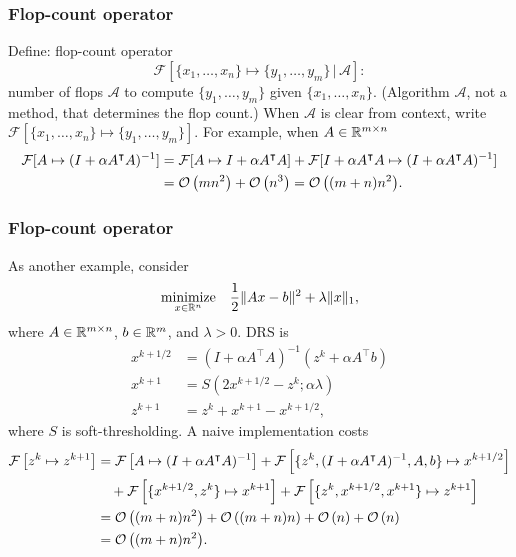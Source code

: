 \documentclass[10pt,mathserif]{beamer}
\begin{document}
\begin{frame}[fragile]
\frametitle{Flop-count operator}
Define: flop-count operator
\[
\mathcal{F}\left[\{x_1,\dots,x_n\}\mapsto\{y_1,\dots,y_m\}\,|\,\mathcal{A}\right]:
\]
number of flops $\mathcal{A}$ to compute $\{y_1,\dots,y_m\}$ given $\{x_1,\dots,x_n\}$.
(Algorithm $\mathcal{A}$, not a method, that determines the flop count.)
\medskip
When $\mathcal{A}$ is clear from context, %
write
$
\mathcal{F}\left[\{x_1,\dots,x_n\}\mapsto\{y_1,\dots,y_m\}\right].
$
%
\medskip \pause
For example, when $A\in \mathbb{R}^{m\times n}$
\begingroup\makeatletter\def\f@size{9}\check@mathfonts
\begin{align*}
\mathcal{F}[A\mapsto(I+\alpha A^\intercal A)^{-1}]
&=
\mathcal{F}[A\mapsto I+\alpha A^\intercal A]+\mathcal{F}[ I+\alpha A^\intercal A\mapsto (I+\alpha A^\intercal A)^{-1}]\\
&={\mathcal{O}\left(mn^2\right)}+{\mathcal{O}\left(n^3\right)}
={\mathcal{O}\left((m+n)n^2\right)}.
\end{align*}
\endgroup
\end{frame}


\begin{frame}
\frametitle{Flop-count operator}
As another example, consider
\[
\begin{array}{ll}
\underset{x\in \mathbb{R}^n}{\mbox{minimize}}
&
\displaystyle{\frac{1}{2}\|Ax-b\|^2+\lambda\|x\|_1,}
\end{array}
\]
where $A\in \mathbb{R}^{m\times n}$, $b\in \mathbb{R}^m$, and $\lambda>0$. DRS is
\begin{align*}
x^{k+1/2}&=(I+\alpha A^\intercal A)^{-1}(z^k+\alpha A^\intercal b)\\
x^{k+1}&=S(2x^{k+1/2}-z^k;\alpha \lambda)\\
z^{k+1}&=z^k+x^{k+1}-x^{k+1/2},
\end{align*}
where $S$ is soft-thresholding.
 \pause
A naive implementation costs
\begingroup\makeatletter\def\f@size{9}\check@mathfonts
\begin{align*}
\mathcal{F}\left[z^k\mapsto z^{k+1}\right]&=
\mathcal{F}\left[A\mapsto (I+\alpha A^\intercal A)^{-1}\right]
+
\mathcal{F}\left[\{z^k,(I+\alpha A^\intercal A)^{-1},A,b\}\mapsto x^{k+1/2}\right]\\
&\quad +
\mathcal{F}\left[\{x^{k+1/2},z^k\}\mapsto x^{k+1}\right]
+
\mathcal{F}\left[\{z^k,x^{k+1/2},x^{k+1}\}\mapsto z^{k+1}\right]\\
&={\mathcal{O}\left((m+n)n^2\right)}+{\mathcal{O}\left((m+n)n\right)}
+{\mathcal{O}\left(n\right)}+{\mathcal{O}\left(n\right)}\\
&={\mathcal{O}\left((m+n)n^2\right)}.
\end{align*}
\endgroup
\end{frame}
\end{document}
